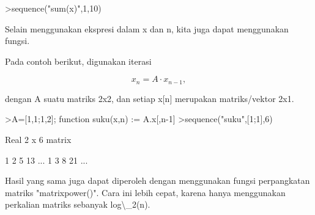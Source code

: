 \documentclass[a4paper,10pt]{article}
\begin{document}
\begin{eulernotebook}
\begin{eulercomment}
\begin{eulercomment}
\begin{eulercomment}
\begin{eulercomment}
\begin{eulercomment}
\begin{eulercomment}
\begin{eulercomment}
\begin{eulercomment}
\begin{eulercomment}
\begin{eulercomment}
\begin{eulercomment}
\begin{eulercomment}
\begin{eulercomment}
\begin{eulercomment}
\begin{eulercomment}
\begin{eulercomment}
\begin{eulercomment}
\begin{eulercomment}
\begin{eulercomment}
\begin{eulercomment}
\begin{eulercomment}
\begin{eulercomment}
\begin{eulercomment}
\begin{eulercomment}
\begin{eulercomment}
\begin{eulercomment}
\begin{eulercomment}
\begin{eulercomment}
\begin{eulercomment}
\end{eulercomment}
\begin{eulerprompt}
>sequence("sum(x)",1,10)
\end{eulerprompt}
\begin{euleroutput}
  [1,  1,  2,  4,  8,  16,  32,  64,  128,  256]
\end{euleroutput}
\begin{eulercomment}
Selain menggunakan ekspresi dalam x dan n, kita juga dapat menggunakan
fungsi.

Pada contoh berikut, digunakan iterasi

\end{eulercomment}
\begin{eulerformula}
\[
x_n =A \cdot x_{n-1},
\]
\end{eulerformula}
\begin{eulercomment}
dengan A suatu matriks 2x2, dan setiap x[n] merupakan matriks/vektor
2x1.
\end{eulercomment}
\begin{eulerprompt}
>A=[1,1;1,2]; function suku(x,n) := A.x[,n-1]
>sequence("suku",[1;1],6)
\end{eulerprompt}
\begin{euleroutput}
  Real 2 x 6 matrix
  
              1             2             5            13     ...
              1             3             8            21     ...
\end{euleroutput}
\begin{eulercomment}
Hasil yang sama juga dapat diperoleh dengan menggunakan fungsi
perpangkatan matriks "matrixpower()". Cara ini lebih cepat, karena
hanya menggunakan perkalian matriks sebanyak log\textbackslash{}\_2(n).


\end{eulercomment}
\end{eulercomment}
\end{eulercomment}
\end{eulercomment}
\end{eulercomment}
\end{eulercomment}
\end{eulercomment}
\end{eulercomment}
\end{eulercomment}
\end{eulercomment}
\end{eulercomment}
\end{eulercomment}
\end{eulercomment}
\end{eulercomment}
\end{eulercomment}
\end{eulercomment}
\end{eulercomment}
\end{eulercomment}
\end{eulercomment}
\end{eulercomment}
\end{eulercomment}
\end{eulercomment}
\end{eulercomment}
\end{eulercomment}
\end{eulercomment}
\end{eulercomment}
\end{eulercomment}
\end{eulercomment}
\end{eulercomment}
\end{eulernotebook}
\end{document}
